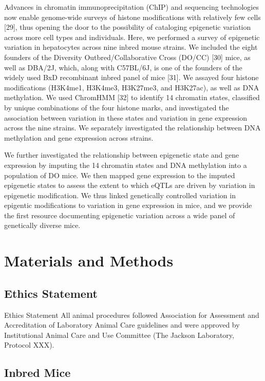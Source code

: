 \documentclass[10pt,letterpaper]{article}
\begin{document}
Advances in chromatin immunoprecipitation (ChIP) and sequencing
technologies now enable genome-wide surveys of histone modifications
with relatively few cells {[}29{]}, thus opening the door to the
possibility of cataloging epigenetic variation across more cell types
and individuals. Here, we performed a survey of epigenetic variation in
hepatocytes across nine inbred mouse strains. We included the eight
founders of the Diversity Outbred/Collaborative Cross (DO/CC) {[}30{]}
mice, as well as DBA/2J, which, along with C57BL/6J, is one of the
founders of the widely used BxD recombinant inbred panel of mice
{[}31{]}. We assayed four histone modifications (H3K4me1, H3K4me3,
H3K27me3, and H3K27ac), as well as DNA methylation. We used ChromHMM
{[}32{]} to identify 14 chromatin states, classified by unique
combinations of the four histone marks, and investigated the association
between variation in these states and variation in gene expression
across the nine strains. We separately investigated the relationship
between DNA methylation and gene expression across strains.

We further investigated the relationship between epigenetic state and
gene expression by imputing the 14 chromatin states and DNA methylation
into a population of DO mice. We then mapped gene expression to the
imputed epigenetic states to assess the extent to which eQTLs are driven
by variation in epigenetic modification. We thus linked genetically
controlled variation in epigentic modifications to variation in gene
expression in mice, and we provide the first resource documenting
epigenetic variation across a wide panel of genetically diverse mice.

\hypertarget{materials-and-methods}{%
\section{Materials and Methods}\label{materials-and-methods}}

\hypertarget{ethics-statement}{%
\subsection{Ethics Statement}\label{ethics-statement}}

Ethics Statement All animal procedures followed Association for
Assessment and Accreditation of Laboratory Animal Care guidelines and
were approved by Institutional Animal Care and Use Committee (The
Jackson Laboratory, Protocol XXX).

\hypertarget{inbred-mice}{%
\subsection{Inbred Mice}\label{inbred-mice}}
\end{document}
